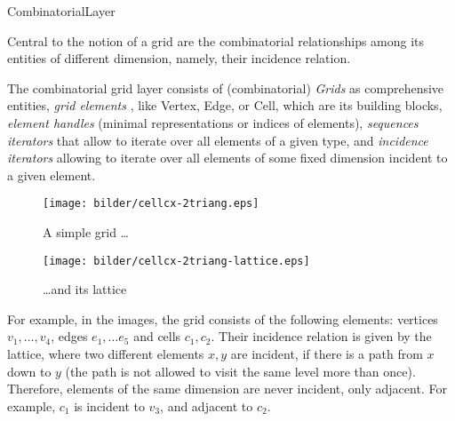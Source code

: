   \begin{Label}{CombinatorialLayer}
  \end{Label}
  Central to the notion of a grid are the combinatorial relationships
  among its entities of different dimension, namely, their incidence relation.

  The combinatorial grid layer consists of 
  (combinatorial) {\em Grids\/} 
  as comprehensive entities,
  {\em grid elements\/} ,
  like Vertex, Edge, or Cell, which are its building blocks,
  {\em element handles\/} 
  (minimal representations or indices of elements),
  {\em sequences iterators\/}  
  that allow to iterate over all elements of a given type,
  and {\em incidence iterators\/} 
  allowing to iterate over all elements of some fixed dimension
  incident to a given element.

  \begin{center}
  \begin{figure}[h]
    \T\begin{minipage}{6cm}
        \T\texttt{[image: bilder/cellcx-2triang.eps]} 
        \W{}
        \caption{A simple grid \ldots}
      \T\end{minipage}  \T\hspace{1cm}
    \T\begin{minipage}{6cm}
        \T\texttt{[image: bilder/cellcx-2triang-lattice.eps]} 
        \W{}
        \caption{\ldots and its lattice}
      \T\end{minipage}
    \end{figure}
  \end{center}

  For example, in the images, the grid consists of the following elements:
  vertices $v_1, \ldots, v_4$, edges $e_1, \ldots e_5$ and cells $c_1, c_2$.
  Their incidence relation is given by the lattice, where two different elements
  $x, y$
  are incident, if there is a path from  $x$ down to $y$  (the path is not allowed to
  visit the same level more than once). Therefore, elements of the same dimension
  are never incident, only adjacent. For example, $c_1$ is incident to $v_3$,
  and adjacent to $c_2$.

